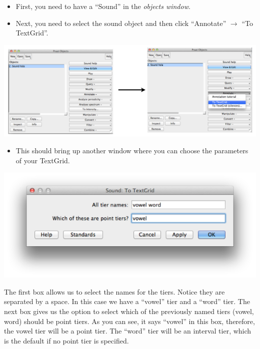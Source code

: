 \documentclass[12pt]{article}
\begin{document}
\begin{itemize}
	\item First, you need to have a ``Sound'' in the \emph{objects window}. 
	\item Next, you need to select the sound object and then click ``Annotate'' $\rightarrow$ ``To TextGrid''. 
\end{itemize}

\begin{center}
	\includegraphics[scale=.4]{tg3.png}
\end{center}

\begin{itemize}
	\item This should bring up another window where you can choose the parameters of your TextGrid. 
\end{itemize}

\begin{center}
	\includegraphics[scale=.25]{tg4.png}
\end{center}

\noindent The first box allows us to select the names for the tiers. Notice they are separated by a space. In this case we have a ``vowel'' tier and a ``word'' tier. The next box gives us the option to select which of the previously named tiers (vowel, word) should be point tiers. As you can see, it says ``vowel'' in this box, therefore, the vowel tier will be a point tier. The ``word'' tier will be an interval tier, which is the default if no point tier is specified. 
\end{document}
